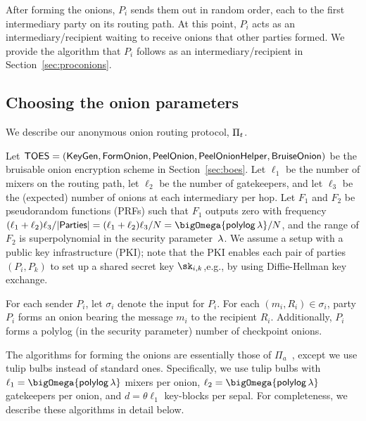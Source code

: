 \documentclass[runningheads,a4paper]{llncs}
\begin{document}
After forming the onions, $P_i$ sends them out in random order, each to the first intermediary party on its routing path. 
At this point, $P_i$ acts as an intermediary/recipient waiting to receive onions that other parties formed. 
We provide the algorithm that $P_i$ follows as an intermediary/recipient in Section~\ref{sec:proconions}. 
\fi

\subsection{Choosing the onion parameters} \label{sec:formonions}

We describe our anonymous onion routing protocol, $\Pi_t$. %

Let $\mathsf{TOES}=(\mathsf{KeyGen}, \mathsf{FormOnion}, \mathsf{PeelOnion}, \mathsf{PeelOnionHelper}, \mathsf{BruiseOnion})$ be the bruisable onion encryption scheme in Section~\ref{sec:boes}. 
Let $\ell_1$ be the number of mixers on the routing path, 
let $\ell_2$ be the number of gatekeepers, and 
let $\ell_3$ be the (expected) number of onions at each intermediary per hop. 
Let $F_1$ and $F_2$ be pseudorandom functions (PRFs) such that $F_1$ outputs zero with frequency $(\ell_1+\ell_2)\ell_3/|\parties| = (\ell_1+\ell_2)\ell_3/N = \bigOmega{\polylog\thinspace\secpar}/N$, and the range of $F_2$ is superpolynomial in the security parameter~$\lambda$. 
We assume a setup with a public key infrastructure (PKI); note that the PKI enables each pair of parties $(P_i, P_k)$ to set up a shared secret key $\sk_{i, k}$,e.g., by using Diffie-Hellman key exchange. 

For each sender $P_i$, let $\sigma_i$ denote the input for $P_i$. 
For each $(m_i, R_i)\in\sigma_i$, party $P_i$ forms an onion bearing the message $m_i$ to the recipient $R_i$. Additionally, $P_i$ forms a polylog (in the security parameter) number of checkpoint onions. 

The algorithms for forming the onions are essentially those of $\Pi_a$~\cite{ICALP:AndLysUpf18}, except we use tulip bulbs instead of standard ones. 
Specifically, we use tulip bulbs with $\ell_1 = \bigOmega{\polylog\thinspace\secpar}$ mixers per onion, $\ell_2 = \bigOmega{\polylog\thinspace\secpar}$ gatekeepers per onion, and $d = \theta\ell_1$ key-blocks per sepal. %
For completeness, we describe these algorithms in detail below. 
\end{document}

